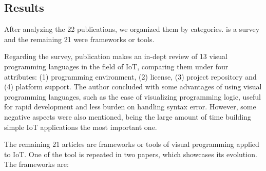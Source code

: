 \subsection{Results}\label{sec:slr_results}

After analyzing the 22 publications, we organized them by categories. \cite{survey_vpl_iot} is a survey and the remaining 21 were frameworks or tools.
\par Regarding the survey, publication \cite{survey_vpl_iot} makes an in-dept review of 13 visual programming languages in the field of IoT, comparing them under four attributes: (1) programming environment, (2) license, (3) project repository and (4) platform support. The author concluded with some advantages of using visual programming languages, such as the ease of visualizing programming logic, useful for rapid development and less burden on handling syntax error. However, some negative aspects were also mentioned, being the large amount of time building simple IoT applications the most important one.
\par The remaining 21 articles are frameworks or tools of visual programming applied to IoT. One of the tool is repeated in two papers, which showcases its evolution. The frameworks are:

